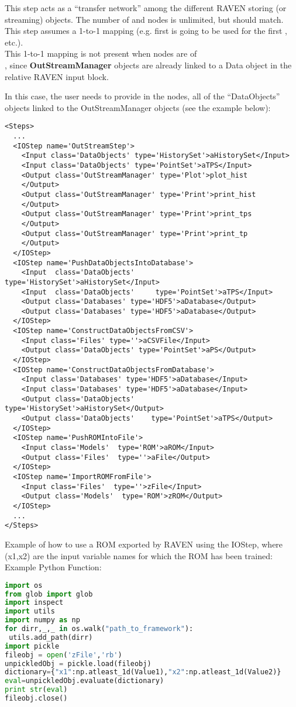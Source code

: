 This step acts as a ``transfer network'' among the different RAVEN storing
(or streaming) objects.
%
The number of  and  nodes is unlimited, but
should match.
%
This step assumes a 1-to-1 mapping (e.g. first  is going to be
used for the first , etc.).
\\
\nb This 1-to-1 mapping is not present when  nodes are of
\\, since  \textbf{OutStreamManager}
objects are already linked to a Data object in the relative RAVEN input block.

In this case, the user needs to provide in the  nodes, all of the 
``DataObjects'' objects linked to the OutStreamManager objects (see the example 
below):
\begin{lstlisting}[style=XML,morekeywords={class}]
<Steps>
  ...
  <IOStep name='OutStreamStep'>
    <Input class='DataObjects' type='HistorySet'>aHistorySet</Input>
    <Input class='DataObjects' type='PointSet'>aTPS</Input>
    <Output class='OutStreamManager' type='Plot'>plot_hist
    </Output>
    <Output class='OutStreamManager' type='Print'>print_hist
    </Output>
    <Output class='OutStreamManager' type='Print'>print_tps
    </Output>
    <Output class='OutStreamManager' type='Print'>print_tp
    </Output>
  </IOStep>
  <IOStep name='PushDataObjectsIntoDatabase'>
    <Input  class='DataObjects'     type='HistorySet'>aHistorySet</Input>
    <Input  class='DataObjects'     type='PointSet'>aTPS</Input>
    <Output class='Databases' type='HDF5'>aDatabase</Output>
    <Output class='Databases' type='HDF5'>aDatabase</Output>
  </IOStep>
  <IOStep name='ConstructDataObjectsFromCSV'>
    <Input class='Files' type=''>aCSVFile</Input>
    <Output class='DataObjects' type='PointSet'>aPS</Output>
  </IOStep>
  <IOStep name='ConstructDataObjectsFromDatabase'>
    <Input class='Databases' type='HDF5'>aDatabase</Input>
    <Input class='Databases' type='HDF5'>aDatabase</Input>
    <Output class='DataObjects'    type='HistorySet'>aHistorySet</Output>
    <Output class='DataObjects'    type='PointSet'>aTPS</Output>
  </IOStep>
  <IOStep name='PushROMIntoFile'>
    <Input class='Models'  type='ROM'>aROM</Input>
    <Output class='Files'  type=''>aFile</Output>
  </IOStep>
  <IOStep name='ImportROMFromFile'>
    <Input class='Files'  type=''>zFile</Input>
    <Output class='Models'  type='ROM'>zROM</Output>
  </IOStep>
  ...
</Steps>
\end{lstlisting}
%
Example of how to use a ROM exported by RAVEN using the IOStep, 
where (x1,x2) are the input variable names for which the ROM has been trained: 
%
Example Python Function:
\begin{lstlisting}[language=python]
import os
from glob import glob
import inspect
import utils
import numpy as np
for dirr,_,_ in os.walk("path_to_framework"):
 utils.add_path(dirr)
import pickle
fileobj = open('zFile','rb')
unpickledObj = pickle.load(fileobj)
dictionary={"x1":np.atleast_1d(Value1),"x2":np.atleast_1d(Value2)}
eval=unpickledObj.evaluate(dictionary)
print str(eval)
fileobj.close()
\end{lstlisting}

